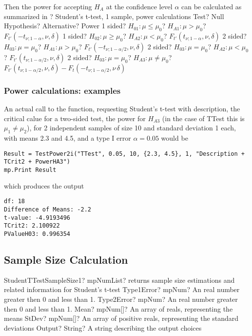 \mpTableFourColsTwoRowsThreeRows
{Then the power for accepting $H_A$ at the confidence level $\alpha$ can be calculated as summarized in ? Student's t-test, 1 sample, power calculations}
{Test? Null Hypothesis? Alternative? Power}
{1 sided? $H_{01}: \mu \leq \mu_0$? $H_{A1}: \mu > \mu_0$? $F_{t'}\left(-t_{\nu;1-\alpha}, \nu, \delta \right)$}
{1 sided? $H_{02}: \mu \geq \mu_0$? $H_{A2}: \mu < \mu_0$? $F_{t'}\left(t_{\nu;1-\alpha}, \nu, \delta \right)$}
{2 sided? $H_{03}: \mu = \mu_0$? $H_{A1}: \mu > \mu_0$? $F_{t'}\left(-t_{\nu;1-\alpha/2}, \nu, \delta \right)$}
{2 sided? $H_{03}: \mu = \mu_0$? $H_{A2}: \mu < \mu_0$? $F_{t'}\left(t_{\nu;1-\alpha/2}, \nu, \delta \right)$}
{2 sided? $H_{03}: \mu = \mu_0$? $H_{A3}: \mu \neq \mu_0$? $F_{t'}\left(t_{\nu;1-\alpha/2}, \nu, \delta \right)-F_t\left(-t_{\nu;1-\alpha/2}, \nu\, \delta \right)$}




\subsubsection{Power calculations: examples}
An actual call to the function, requesting Student's t-test with description, the critical calue for a two-sided test, the power for $H_{A3}$ (in the case of \textsf{TTest} this is $\mu_1 \neq \mu_2$), for 2 independent samples of size 10 and standard deviation 1 each, with means 2.3 and 4.5, and a type I error $\alpha=0.05$ would be

\begin{lstlisting}
Result = TestPower2i("TTest", 0.05, 10, {2.3, 4.5}, 1, "Description + TCrit2 + PowerHA3")
mp.Print Result
\end{lstlisting}
which produces the output

\begin{verbatim}
df: 18
Difference of Means: -2.2
t-value: -4.9193496
TCrit2: 2.100922
PValueH03: 0.996354
\end{verbatim}





\subsection{Sample Size Calculation}


\begin{mpFunctionsExtract}
	\mpFunctionFiveNotImplemented
	{StudentTTestSampleSize1? mpNumList? returns sample size estimations and related information for Student's t-test}
	{Type1Error? mpNum? An real number greater then 0 and less than 1.}
	{Type2Error? mpNum? An real number greater then 0 and less than 1.}
	{Mean? mpNum[]? An array of reals, representing the means}
	{StDev? mpNum[]? An array of positive reals, representing the standard deviations}
	{Output? String? A string describing the output choices}
\end{mpFunctionsExtract}

